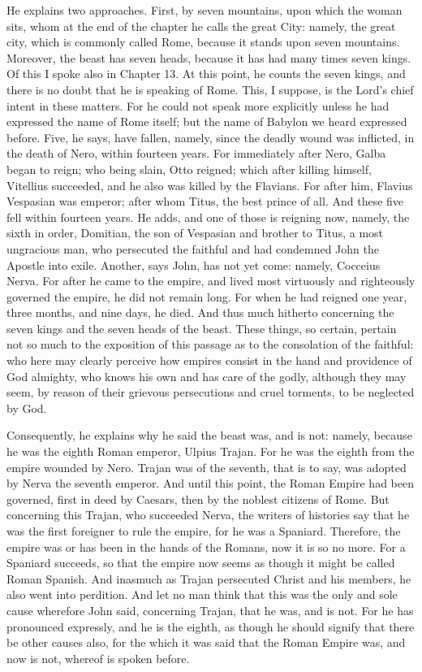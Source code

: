 He explains two approaches. First, by seven mountains, upon which the woman sits, whom at the end of the chapter he calls the great City: namely, the great city, which is commonly called Rome, because it stands upon seven mountains. Moreover, the beast has seven heads, because it has had many times seven kings. Of this I spoke also in Chapter 13. At this point, he counts the seven kings, and there is no doubt that he is speaking of Rome. This, I suppose, is the Lord’s chief intent in these matters. For he could not speak more explicitly unless he had expressed the name of Rome itself; but the name of Babylon we heard expressed before. Five, he says, have fallen, namely, since the deadly wound was inflicted, in the death of Nero, within fourteen years. For immediately after Nero, Galba began to reign; who being slain, Otto reigned; which after killing himself, Vitellius succeeded, and he also was killed by the Flavians. For after him, Flavius Vespasian was emperor; after whom Titus, the best prince of all. And these five fell within fourteen years. He adds, and one of those is reigning now, namely, the sixth in order, Domitian, the son of Vespasian and brother to Titus, a most ungracious man, who persecuted the faithful and had condemned John the Apostle into exile. Another, says John, has not yet come: namely, Cocceius Nerva. For after he came to the empire, and lived most virtuously and righteously governed the empire, he did not remain long. For when he had reigned one year, three months, and nine days, he died. And thus much hitherto concerning the seven kings and the seven heads of the beast. These things, so certain, pertain not so much to the exposition of this passage as to the consolation of the faithful: who here may clearly perceive how empires consist in the hand and providence of God almighty, who knows his own and has care of the godly, although they may seem, by reason of their grievous persecutions and cruel torments, to be neglected by God.

Consequently, he explains why he said the beast was, and is not: namely, because he was the eighth Roman emperor, Ulpius Trajan. For he was the eighth from the empire wounded by Nero. Trajan was of the seventh, that is to say, was adopted by Nerva the seventh emperor. And until this point, the Roman Empire had been governed, first in deed by Caesars, then by the noblest citizens of Rome. But concerning this Trajan, who succeeded Nerva, the writers of histories say that he was the first foreigner to rule the empire, for he was a Spaniard. Therefore, the empire was or has been in the hands of the Romans, now it is so no more. For a Spaniard succeeds, so that the empire now seems as though it might be called Roman Spanish. And inasmuch as Trajan persecuted Christ and his members, he also went into perdition. And let no man think that this was the only and sole cause wherefore John said, concerning Trajan, that he was, and is not. For he has pronounced expressly, and he is the eighth, as though he should signify that there be other causes also, for the which it was said that the Roman Empire was, and now is not, whereof is spoken before.

